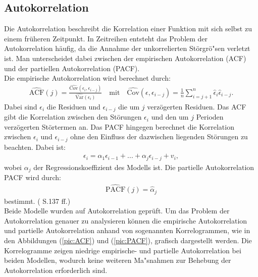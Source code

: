 \documentclass[12pt]{scrreprt}
\begin{document}
\subsection{Autokorrelation}
Die Autokorrelation beschreibt die Korrelation einer Funktion mit sich selbst zu einem früheren Zeitpunkt. In Zeitreihen entsteht das Problem der Autokorrelation häufig, da die Annahme der unkorrelierten Störgrö"sen verletzt ist. Man unterscheidet dabei zwischen der empirischen Autokorrelation (ACF) und der partiellen Autokorrelation (PACF).\\
Die empirische Autokorrelation wird berechnet durch:
\begin{align}
\widehat{\text{ACF}}(j)=\frac{\widehat{\text{Cov}}(\epsilon_{i},\epsilon_{i-j})}{\widehat{\text{Var}}(\epsilon_{i})} \quad \text{mit} \quad \widehat{\text{Cov}}(\epsilon,\epsilon_{i-j})=\frac{1}{n}\sum_{i=j+1}^{n}\hat{\epsilon}_{i}\hat{\epsilon}_{i-j}.
\end{align}
Dabei sind $\epsilon_{i}$ die Residuen und $\epsilon_{i-j}$ die um $j$ verzögerten Residuen. Das ACF gibt die Korrelation zwischen den Störungen $\epsilon_{i}$ und den um $j$ Perioden verzögerten Störtermen an. Das PACF hingegen berechnet die Korrelation zwischen $\epsilon_{i}$ und $\epsilon_{i-j}$ ohne den Einfluss der dazwischen liegenden Störungen zu beachten. Dabei ist:
\begin{align}
\epsilon_{i}=\alpha_{1}\epsilon_{i-1}+...+\alpha_{j}\epsilon_{i-j}
+v_{i},
\end{align}
wobei $\alpha_{j}$ der Regressionskoeffizient des Modells ist. Die partielle Autokorrelation PACF wird durch:
\begin{align}
\widehat{\text{PACF}}(j)=\hat{\alpha}_{j}
\end{align}
bestimmt. (\cite{fahrmeir2007regression} S.137 ff.)\\
Beide Modelle wurden auf Autokorrelation geprüft. Um das Problem der Autokorrelation genauer zu analysieren können die empirische Autokorrelation und partielle Autokorrelation anhand von sogenannten Korrelogrammen, wie in den Abbildungen (\ref{pic:ACF}) und (\ref{pic:PACF}), grafisch dargestellt werden. Die  Korrelogramme zeigen niedrige empirische- und partielle Autokorrelation bei beiden Modellen, wodurch keine weiteren Ma"snahmen zur Behebung der Autokorrelation erforderlich sind.
\end{document}
